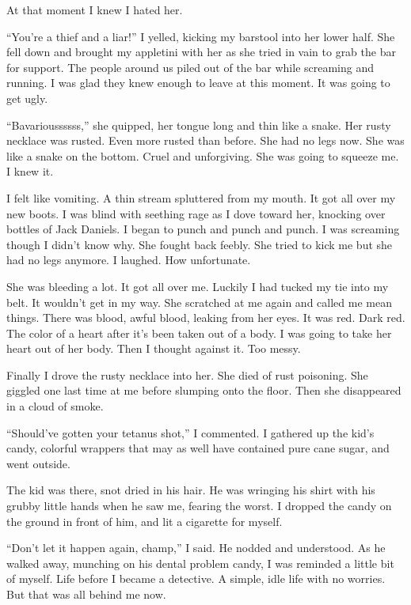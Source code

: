 At that moment I knew I hated her.



``You're a thief and a liar!'' I yelled, kicking my
barstool into her lower half. She fell down and brought my
appletini with her as she tried in vain to grab the bar for
support. The people around us piled out of the bar while screaming
and running. I was glad they knew enough to leave at this moment.
It was going to get ugly.

``Bavarioussssss,'' she quipped, her tongue long and thin
like a snake. Her rusty necklace was rusted. Even more rusted than
before. She had no legs now. She was like a snake on the bottom.
Cruel and unforgiving. She was going to squeeze me. I knew
it.



I felt like vomiting. A thin stream spluttered from my mouth. It
got all over my new boots. I was blind with seething rage as I dove
toward her, knocking over bottles of Jack Daniels. I began to punch
and punch and punch. I was screaming though I didn't know
why. She fought back feebly. She tried to kick me but she had no
legs anymore. I laughed. How unfortunate.



She was bleeding a lot. It got all over me. Luckily I had tucked my
tie into my belt. It wouldn't get in my way. She scratched at
me again and called me mean things. There was blood, awful blood,
leaking from her eyes. It was red. Dark red. The color of a heart
after it's been taken out of a body. I was going to take her
heart out of her body. Then I thought against it. Too messy.



Finally I drove the rusty necklace into her. She died of rust
poisoning. She giggled one last time at me before slumping onto the
floor. Then she disappeared in a cloud of smoke.

``Should've gotten your tetanus shot,'' I
commented. I gathered up the kid's candy, colorful wrappers
that may as well have contained pure cane sugar, and went
outside.



The kid was there, snot dried in his hair. He was wringing his
shirt with his grubby little hands when he saw me, fearing the
worst. I dropped the candy on the ground in front of him, and lit a
cigarette for myself.

``Don't let it happen again, champ,'' I said. He
nodded and understood. As he walked away, munching on his dental
problem candy, I was reminded a little bit of myself. Life before I
became a detective. A simple, idle life with no worries. But that
was all behind me now.



